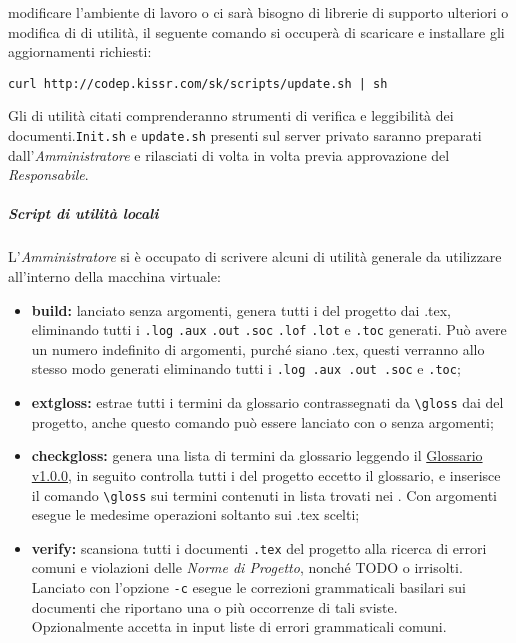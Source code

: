 \documentclass{scalatekids-article}
\begin{document}
modificare l'ambiente di lavoro o ci sarà bisogno di librerie di supporto
ulteriori o modifica di  di utilità, il seguente comando si
occuperà di scaricare e installare gli aggiornamenti richiesti:
\begin{center}
  \verb=curl http://codep.kissr.com/sk/scripts/update.sh | sh=
\end{center}
Gli  di utilità citati comprenderanno strumenti di verifica e
leggibilità dei documenti.\verb=Init.sh= e \verb=update.sh=
presenti sul server privato saranno preparati dall'\textit{Amministratore} e
rilasciati di volta in volta previa approvazione del \textit{Responsabile}.
\subparagraph{Script di utilità locali}
\label{sec:script}
L'\textit{Amministratore} si è occupato di scrivere alcuni  di utilità
generale da utilizzare all'interno della macchina virtuale:
\begin{itemize}
\item\textbf{build:} lanciato senza argomenti, genera tutti i  del
  progetto dai .tex, eliminando tutti i  \verb=.log= \verb=.aux= \verb=.out= \verb=.soc=
  \verb=.lof= \verb=.lot= e \verb=.toc=
  generati. Può avere un numero indefinito di argomenti, purché siano  .tex,
  questi verranno allo stesso modo generati eliminando tutti i 
  \verb=.log .aux .out .soc= e \verb=.toc=;
\item\textbf{extgloss:} estrae tutti i termini da glossario contrassegnati da
  \verb=\gloss= dai  del progetto, anche questo comando può essere lanciato con
  o senza argomenti;
\item\textbf{checkgloss:} genera una lista di termini da glossario leggendo il
	 \href{run:../Esterni/Glossario\_v0.0.1.pdf}{Glossario v1.0.0}, in seguito controlla tutti i  del
  progetto eccetto il glossario, e inserisce il comando \verb=\gloss= sui termini
  contenuti in lista trovati nei . Con argomenti esegue le medesime
  operazioni soltanto sui  .tex scelti;
\item\textbf{verify:} scansiona tutti i documenti \verb=.tex= del progetto alla
  ricerca di errori comuni e violazioni delle \textit{Norme di Progetto}, nonché
  TODO o  irrisolti. Lanciato con l'opzione \verb=-c=
  esegue le correzioni grammaticali basilari sui documenti che riportano una o
  più occorrenze di tali sviste.\\
  Opzionalmente accetta in input liste di errori grammaticali comuni.
\end{itemize}
\end{document}
